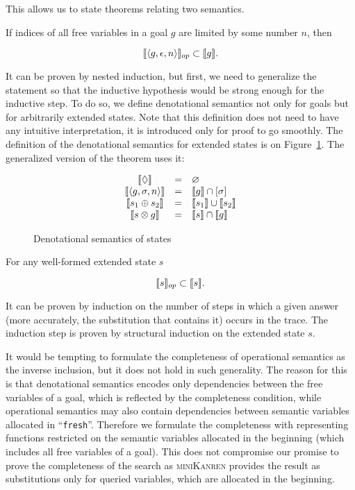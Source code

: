 This allows us to state theorems relating two semantics.

\begin{theorem}
If indices of all free variables in a goal $g$ are limited by some number $n$, then

\[
\llbracket{\left<{g, \epsilon, n}\right>}\rrbracket_{op} \subset \llbracket{g}\rrbracket.
\]
\end{theorem}

It can be proven by nested induction, but first, we need to generalize the statement so that the inductive hypothesis would be strong enough for the inductive step.
To do so, we define denotational semantics not only for goals but for arbitrarily extended states. Note that this definition does not need to have any intuitive
interpretation, it is introduced only for proof to go smoothly. The definition of the denotational semantics for extended states is on Figure~\ref{denotational_semantics_of_states}.
The generalized version of the theorem uses it:

\begin{figure}[t]
  \[
  \begin{array}{ccl}
    \llbracket{\Diamond}\rrbracket&=&\varnothing\\
    \llbracket{\left<{g, \sigma, n}\right>}\rrbracket&=&\llbracket{g}\rrbracket\cap[\sigma]\\
    \llbracket{s_1 \oplus s_2}\rrbracket&=&\llbracket{s_1}\rrbracket\cup\llbracket{s_2}\rrbracket\\
    \llbracket{s \otimes g}\rrbracket&=&\llbracket{s}\rrbracket\cap\llbracket{g}\rrbracket\\
  \end{array}
  \]
  \caption{Denotational semantics of states}
  \label{denotational_semantics_of_states}
\end{figure}

\begin{lemma}
For any well-formed extended state $s$

\[
\llbracket{s}\rrbracket_{op} \subset \llbracket{s}\rrbracket.
\]
\end{lemma}

It can be proven by induction on the number of steps in which a given answer (more accurately, the substitution that contains it) occurs in the trace.
The induction step is proven by structural induction on the extended state $s$.

It would be tempting to formulate the completeness of operational semantics as the inverse inclusion, but it does not hold in such generality. The reason for
this is that denotational semantics encodes only dependencies between the free variables of a goal, which is reflected by the completeness condition, while
operational semantics may also contain dependencies between semantic variables allocated in ``\lstinline|fresh|''. Therefore we formulate the completeness
with representing functions restricted on the semantic variables allocated in the beginning (which includes all free variables of a goal). This does not
compromise our promise to prove the completeness of the search as \textsc{miniKanren} provides the result as substitutions only for queried variables,
which are allocated in the beginning.

